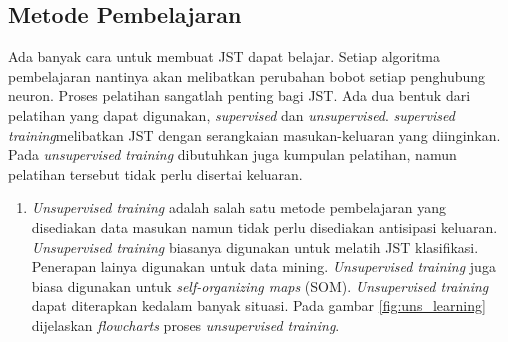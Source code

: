 \subsection{Metode Pembelajaran}
Ada banyak cara untuk membuat JST dapat belajar. Setiap algoritma pembelajaran nantinya akan melibatkan perubahan bobot setiap penghubung neuron. Proses pelatihan sangatlah penting bagi JST. Ada dua bentuk dari pelatihan yang dapat digunakan,\textit{ supervised }dan \textit{unsupervised}.\textit{ supervised training}melibatkan JST dengan serangkaian masukan-keluaran yang diinginkan. Pada \textit{unsupervised training} dibutuhkan juga kumpulan pelatihan, namun pelatihan tersebut tidak perlu disertai keluaran.
\begin{enumerate}
	\item \textit{Unsupervised training} adalah salah satu metode pembelajaran yang disediakan data masukan namun tidak perlu disediakan antisipasi keluaran. \textit{Unsupervised training} biasanya digunakan untuk melatih JST klasifikasi. Penerapan lainya digunakan untuk data mining. \textit{Unsupervised training} juga biasa digunakan untuk \textit{self-organizing maps} (SOM). \textit{Unsupervised training} dapat diterapkan kedalam banyak situasi. Pada gambar \ref{fig:uns_learning} dijelaskan \textit{flowcharts} proses \textit{unsupervised training}.\\
	

\end{enumerate}

